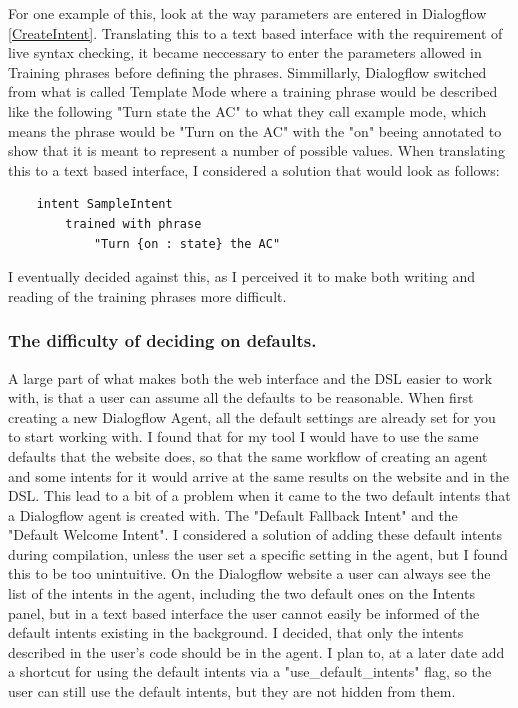 For one example of this, look at the way parameters are entered in Dialogflow \autoref{CreateIntent}. Translating this to a text based interface with the requirement of live syntax checking, it became neccessary to enter the parameters allowed in Training phrases before defining the phrases.
Simmillarly, Dialogflow switched from what is called Template Mode where a training phrase would be described like the following "Turn state the AC" to what they call example mode, which means the phrase would be "Turn on the AC" with the "on" beeing annotated to show that it is meant to represent a number of possible values.
When translating this to a text based interface, I considered a solution that would look as follows:

\begin{verbatim}
    intent SampleIntent
        trained with phrase
            "Turn {on : state} the AC"
\end{verbatim}

I eventually decided against this, as I perceived it to make both writing and reading of the training phrases more difficult.

\subsubsection{The difficulty of deciding on defaults.}

A large part of what makes both the web interface and the DSL easier to work with, is that a user can assume all the defaults to be reasonable. When first creating a new Dialogflow Agent, all the default settings are already set for you to start working with. I found that for my tool I would have to use the same defaults that the website does, so that the same workflow of creating an agent and some intents for it would arrive at the same results on the website and in the DSL. 
This lead to a bit of a problem when it came to the two default intents that a Dialogflow agent is created with. The "Default Fallback Intent" and the "Default Welcome Intent". 
I considered a solution of adding these default intents during compilation, unless the user set a specific setting in the agent, but I found this to be too unintuitive. On the Dialogflow website a user can always see the list of the intents in the agent, including the two default ones on the Intents panel, but in a text based interface the user cannot easily be informed of the default intents existing in the background. I decided, that only the intents described in the user's code should be in the agent. I plan to, at a later date add a shortcut for using the default intents via a "use\_default\_intents" flag, so the user can still use the default intents, but they are not hidden from them.

